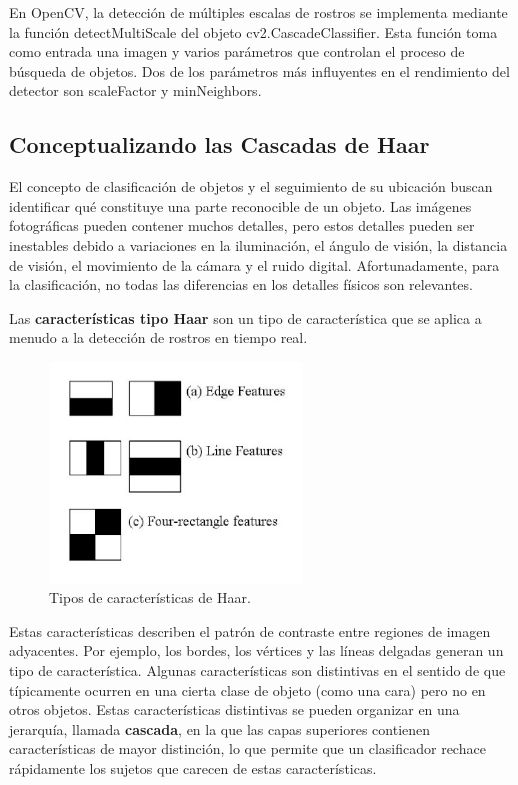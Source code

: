 \documentclass[a4paper]{article}
\begin{document}
En OpenCV, la detección de múltiples escalas de rostros se implementa
mediante la función detectMultiScale del objeto cv2.CascadeClassifier.
Esta función toma como entrada una imagen y varios parámetros que controlan
el proceso de búsqueda de objetos. Dos de los parámetros más influyentes en el
rendimiento del detector son scaleFactor y minNeighbors.

\subsection{Conceptualizando las Cascadas de Haar}

El concepto de clasificación de objetos y el seguimiento de su ubicación buscan identificar qué constituye una parte reconocible de un objeto. Las imágenes fotográficas pueden contener muchos detalles, pero estos detalles pueden ser inestables debido a variaciones en la iluminación, el ángulo de visión, la distancia de visión, el movimiento de la cámara y el ruido digital. Afortunadamente, para la clasificación, no todas las diferencias en los detalles físicos son relevantes.

Las \textbf{características tipo Haar} son un tipo de característica que se aplica a menudo a la detección de rostros en tiempo real. 
\begin{figure}[h!]
    \centering
    \includegraphics[width=0.6\textwidth]{../img/haar_feat.png}
    \caption{Tipos de características de Haar.}
\end{figure}

Estas características describen el patrón de contraste entre regiones de imagen adyacentes. Por ejemplo, los bordes, los vértices y las líneas delgadas generan un tipo de característica. Algunas características son distintivas en el sentido de que típicamente ocurren en una cierta clase de objeto (como una cara) pero no en otros objetos. Estas características distintivas se pueden organizar en una jerarquía, llamada \textbf{cascada}, en la que las capas superiores contienen características de mayor distinción, lo que permite que un clasificador rechace rápidamente los sujetos que carecen de estas características.
\end{document}
